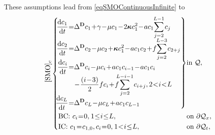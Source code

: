\documentclass{article}
\begin{document}
                These assumptions lead from \eqref{eqSMOContinuousInfinite} to
                \newcommand\vspcESMO{-5pt}
                \newcommand\vspcRSMO{-4pt}
                \begin{equation}
                    \SpazMate{1}{1}{1}
                    \refstepcounter{equation}
                    \label{eqSMOContinuous}
                    \vcenter{\hbox{\rotatebox{90}{\hspace{7pt}[SMO]$_c$}}}
                    \left\{\begin{alignedat}{2}
                        &\hspace{-.2cm plus .1cm minus .1cm}
                        \left.\begin{aligned}
                            \derT{c_1}t=&\DeltaD c_1
                            +\gamma-\mu c_1-2\boldsymbol\kappa c_1^2-
                            ac_1\!\!\sum_{j=2}^{L-1}c_j\\[\vspcESMO]
                            \derT{c_2}t=&\DeltaD c_2
                            -\mu c_2+\boldsymbol\kappa c_1^2-ac_1c_2+
                            f\!\!\sum_{j=2}^{L-3}c_{2+j}\\[\vspcESMO]
                            \derT{c_i}t=&\DeltaD c_i
                            -\mu c_i+ac_1c_{i-1}-ac_1c_i\\[\vspcRSMO]
                            &-\frac{(i-3)}2fc_i+
                            f\!\!\!\!\!\!\!\!\sum_{j=2}^{L-i-1}c_{i+j},
                            \;\;2<i<L\\[\vspcESMO]
                            \derT{c_L}t=&\DeltaD c_L-\mu c_L+ac_1c_{L-1}
                        \end{aligned}\right\}
                        &&\text{in }\STCyl,\\
                        &\text{BC: }c_i=0,\;\;\; 1\le i\le L,
                        &&\text{on }\partial\STCyl_x,\\
                        &\text{IC: }c_1=c_{1,0},\;\; c_i=0,\;\;\;1<i\le L,
                        &&\text{on }\partial\STCyl_t,
                    \end{alignedat}\right.\notag%
                \end{equation}
\end{document}
